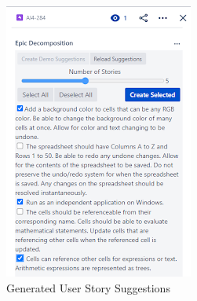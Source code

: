 \begin{figure}[ht]
\begin{subfigure}{.5\textwidth}
\centering
\includegraphics[width=.8\linewidth,keepaspectratio]{./figure/Scenario1Figure2.png}
\caption{Generated User Story Suggestions}
\label{fig:Scenario1Figure2}
\end{subfigure}
\begin{subfigure}{.5\textwidth}
\centering

\end{subfigure}
\end{figure}
